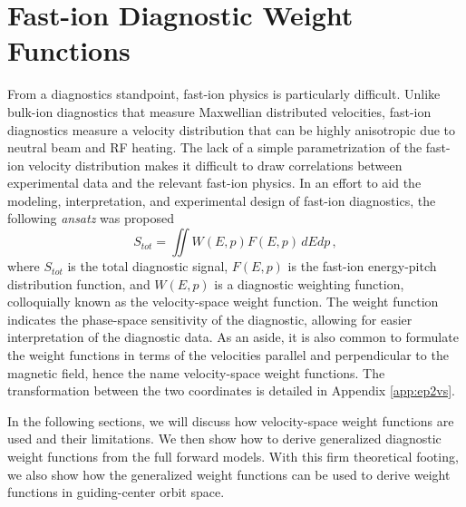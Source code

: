 \chapter{Fast-ion Diagnostic Weight Functions}\label{chap:weights}

From a diagnostics standpoint, fast-ion physics is particularly difficult.
Unlike bulk-ion diagnostics that measure Maxwellian distributed velocities, fast-ion diagnostics  measure a velocity distribution that can be highly anisotropic due to neutral beam and RF heating.
The lack of a simple parametrization of the fast-ion velocity distribution makes it difficult to draw correlations between experimental data and the relevant fast-ion physics.
In an effort to aid the modeling, interpretation, and experimental design of fast-ion diagnostics, the following \textit{ansatz} was proposed\cite{heidbrink2007}
\begin{equation}\label{eq:vs_WF}
    S_{tot} = \iint W(E,p)F(E,p)\,dEdp\,,
\end{equation}
where $S_{tot}$ is the total diagnostic signal, $F(E,p)$ is the fast-ion energy-pitch distribution function, and $W(E,p)$ is a diagnostic weighting function, colloquially known as the velocity-space weight function. The weight function indicates the phase-space sensitivity of the diagnostic, allowing for easier interpretation of the diagnostic data. As an aside, it is also common to formulate the weight functions in terms of the velocities parallel and perpendicular to the magnetic field, hence the name velocity-space weight functions. The transformation between the two coordinates is detailed in Appendix \ref{app:ep2vs}.

In the following sections, we will discuss how velocity-space weight functions are used and their limitations. We then show how to derive generalized diagnostic weight functions from the full forward models. With this firm theoretical footing, we also show how the generalized weight functions can be used to derive weight functions in guiding-center orbit space.

